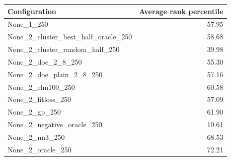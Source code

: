 \begin{tabular}{lr}
\toprule
Configuration & Average rank percentile \\
\midrule
None_1_250 & 57.95 \\
None_2_cluster_best_half_oracle_250 & 58.68 \\
None_2_cluster_random_half_250 & 39.98 \\
None_2_doe_2_8_250 & 55.30 \\
None_2_doe_plain_2_8_250 & 57.16 \\
None_2_elm100_250 & 60.58 \\
None_2_fitloss_250 & 57.09 \\
None_2_gp_250 & 61.90 \\
None_2_negative_oracle_250 & 10.61 \\
None_2_nn3_250 & 68.53 \\
None_2_oracle_250 & 72.21 \\
\bottomrule
\end{tabular}
